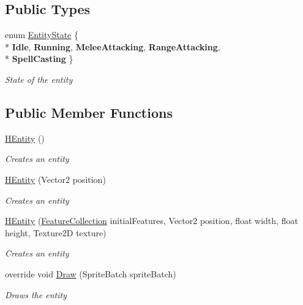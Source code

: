 \subsection*{Public Types}
\begin{DoxyCompactItemize}
\item 
enum \hyperlink{class_hel_project_1_1_game_world_1_1_entities_1_1_h_entity_af0044d8a58b65254f673f8c0ecfecdea}{Entity\+State} \{ \\*
{\bfseries Idle}, 
{\bfseries Running}, 
{\bfseries Melee\+Attacking}, 
{\bfseries Range\+Attacking}, 
\\*
{\bfseries Spell\+Casting}
 \}
\begin{DoxyCompactList}\small\item\em State of the entity \end{DoxyCompactList}\end{DoxyCompactItemize}
\subsection*{Public Member Functions}
\begin{DoxyCompactItemize}
\item 
\hyperlink{class_hel_project_1_1_game_world_1_1_entities_1_1_h_entity_a0f76dfa203f3b1802a15d809b4c33170}{H\+Entity} ()
\begin{DoxyCompactList}\small\item\em Creates an entity \end{DoxyCompactList}\item 
\hyperlink{class_hel_project_1_1_game_world_1_1_entities_1_1_h_entity_af078f47455d53ed5785b07a41fbec28a}{H\+Entity} (Vector2 position)
\begin{DoxyCompactList}\small\item\em Creates an entity \end{DoxyCompactList}\item 
\hyperlink{class_hel_project_1_1_game_world_1_1_entities_1_1_h_entity_a9a43246b0100b8963eb5410ad1eff235}{H\+Entity} (\hyperlink{class_hel_project_1_1_features_1_1_feature_collection}{Feature\+Collection} initial\+Features, Vector2 position, float width, float height, Texture2\+D texture)
\begin{DoxyCompactList}\small\item\em Creates an entity \end{DoxyCompactList}\item 
override void \hyperlink{class_hel_project_1_1_game_world_1_1_entities_1_1_h_entity_aac4efdcaa42e096838556aba9345f8d5}{Draw} (Sprite\+Batch sprite\+Batch)
\begin{DoxyCompactList}\small\item\em Draws the entity \end{DoxyCompactList}\end{DoxyCompactItemize}
